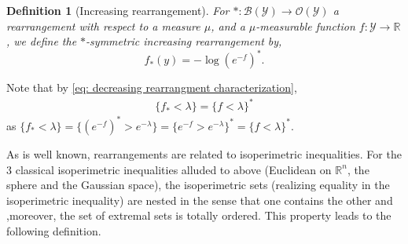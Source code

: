 \documentclass[11pt]{article}
\newtheorem{definition}[conjecture]{Definition}
\newcommand{\1}{[1]}
\begin{document}
\begin{definition}[Increasing rearrangement]
    For $* \colon \mathcal{B}(\mathcal{Y}) \to \mathcal{O}(\mathcal{Y})$ a rearrangement with respect to a measure $\mu$, and a $\mu$-measurable function $f: \mathcal{Y} \to \mathbb{R}$, we define the $*$-symmetric \emph{increasing rearrangement} by,
    \[
        f_*(y) = - \log (e^{-f})^*.
    \]
\end{definition}

Note that by \eqref{eq: decreasing rearrangment characterization}, 
\begin{align} \label{eq: increasing rearrangement characterization}
    \{ f_* < \lambda \} = \{ f < \lambda \}^*
\end{align}
as $\{ f_* < \lambda \} = \{ (e^{-f})^* > e^{-\lambda} \} = \{ e^{-f} > e^{- \lambda } \}^* = \{ f < \lambda \}^*$.

As is well known, rearrangements are related to isoperimetric inequalities.
For the 3 classical isoperimetric inequalities alluded to above (Euclidean on $\mathbb{R}^n$, the sphere and the Gaussian space), the isoperimetric sets (realizing equality in the isoperimetric inequality) are nested 
in the sense that one contains the other and ,moreover, the set of extremal sets is totally ordered. This property leads to the following definition.





\end{document}

